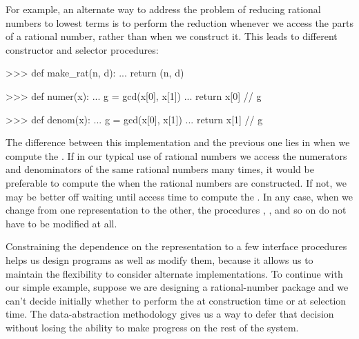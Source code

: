 For example, an alternate way to address the problem of reducing rational
numbers to lowest terms is to perform the reduction whenever we access the
parts of a rational number, rather than when we construct it.  This leads to
different constructor and selector procedures:

\begin{codeBlock}
>>> def make_rat(n, d):
...     return (n, d)

>>> def numer(x):
...     g = gcd(x[0], x[1])
...     return x[0] // g

>>> def denom(x):
...     g = gcd(x[0], x[1])
...     return x[1] // g
\end{codeBlock}

\noindent
The difference between this implementation and the previous one lies in when we
compute the .  If in our typical use of rational numbers we access
the numerators and denominators of the same rational numbers many times, it
would be preferable to compute the  when the rational numbers are
constructed.  If not, we may be better off waiting until access time to compute
the .  In any case, when we change from one representation to the
other, the procedures , , and so on do not have to
be modified at all.

Constraining the dependence on the representation to a few interface procedures
helps us design programs as well as modify them, because it allows us to
maintain the flexibility to consider alternate implementations.  To continue
with our simple example, suppose we are designing a rational-number package and
we can't decide initially whether to perform the  at construction
time or at selection time.  The data-abstraction methodology gives us a way to
defer that decision without losing the ability to make progress on the rest of
the system.

